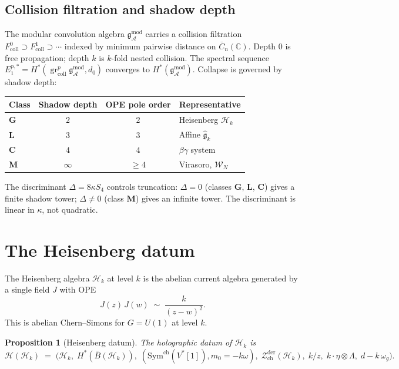 \documentclass[11pt,reqno]{amsart}
\newtheorem{proposition}[theorem]{Proposition}
\theoremstyle{definition}
\theoremstyle{remark}
\newcommand{\cA}{\mathcal{A}}
\newcommand{\cH}{\mathcal{H}}
\newcommand{\cW}{\mathcal{W}}
\newcommand{\cZ}{\mathcal{Z}}
\newcommand{\Sym}{\mathrm{Sym}}
\newcommand{\barB}{\bar{B}}
\newcommand{\FM}{\overline{C}}
\newcommand{\fg}{\mathfrak{g}}
\newcommand{\gmod}{\mathfrak{g}^{\mathrm{mod}}_{\cA}}
\newcommand{\bC}{\mathbb{C}}
\DeclareMathOperator{\coll}{coll}
\DeclareMathOperator{\gr}{gr}
\numberwithin{equation}{section}
\begin{document}
\subsection{Collision filtration and shadow depth}
\label{subsec:collision}

The modular convolution algebra $\gmod$ carries a collision
filtration $F^0_{\coll} \supset F^1_{\coll} \supset \cdots$
indexed by minimum pairwise distance on $\FM_n(\bC)$. Depth $0$
is free propagation; depth $k$ is $k$-fold nested collision. The
spectral sequence
$E_1^{p,*} = H^*(\gr^p_{\coll}\gmod, d_0)$ converges to
$H^*(\gmod)$. Collapse is governed by shadow depth:
\begin{center}
\renewcommand{\arraystretch}{1.15}
\begin{tabular}{lccl}
\toprule
Class & Shadow depth & OPE pole order & Representative \\
\midrule
$\mathbf{G}$ & $2$ & $2$ & Heisenberg $\cH_k$ \\
$\mathbf{L}$ & $3$ & $3$ & Affine $\widehat{\fg}_k$ \\
$\mathbf{C}$ & $4$ & $4$ & $\beta\gamma$ system \\
$\mathbf{M}$ & $\infty$ & $\geq 4$ & Virasoro, $\cW_N$ \\
\bottomrule
\end{tabular}
\end{center}
The discriminant $\Delta = 8\kappa S_4$ controls truncation:
$\Delta = 0$ (classes $\mathbf{G}$, $\mathbf{L}$, $\mathbf{C}$)
gives a finite shadow tower; $\Delta \neq 0$ (class $\mathbf{M}$)
gives an infinite tower. The discriminant is linear in $\kappa$,
not quadratic.


\section{The Heisenberg datum}\label{sec:heisenberg}

The Heisenberg algebra $\cH_k$ at level $k$ is the abelian current
algebra generated by a single field $J$ with OPE
\begin{equation}\label{eq:heis-ope}
J(z)\,J(w) \;\sim\; \frac{k}{(z-w)^2}.
\end{equation}
This is abelian Chern--Simons for $G = U(1)$ at level $k$.

\begin{proposition}[Heisenberg datum]\label{prop:heis-datum}
The holographic datum of $\cH_k$ is
\begin{equation}\label{eq:heis-datum}
\cH(\cH_k) \;=\;
\bigl(\cH_k,\; H^*(\barB(\cH_k)),\;
(\Sym^{\mathrm{ch}}(V^*[1]),m_0=-k\omega),\;
\cZ^{\mathrm{der}}_{\mathrm{ch}}(\cH_k),\; k/z,\;
k \cdot \eta \otimes \Lambda,\; d-k\,\omega_g\bigr).
\end{equation}
\end{proposition}
\end{document}
